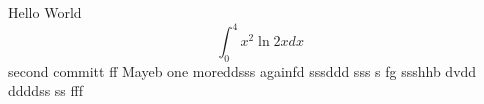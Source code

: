 \documentclass{article}
\begin{document}
Hello World
$$\int_0^4 x^2 \ln{2x}dx$$
second committ  ff
Mayeb
one moreddsss
againfd
sssddd sss
s fg
ssshhb dvdd ddddss ss fff
\end{document}
